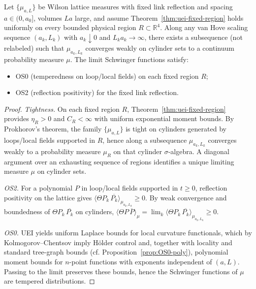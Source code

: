 \documentclass[11pt]{amsart}
\begin{document}
\medskip
\begin{proposition}\label{prop:os0os2-closure}
Let $\{\mu_{a,L}\}$ be Wilson lattice measures with fixed link reflection and spacing $a\in(0,a_0]$, volumes $L a$ large, and assume Theorem~\ref{thm:uei-fixed-region} holds uniformly on every bounded physical region $R\subset\mathbb R^4$. Along any van Hove scaling sequence $(a_k,L_k)$ with $a_k\downarrow 0$ and $L_k a_k\to\infty$, there exists a subsequence (not relabeled) such that $\mu_{a_k,L_k}$ converges weakly on cylinder sets to a continuum probability measure $\mu$. The limit Schwinger functions satisfy:
\begin{itemize}
  \item OS0 (temperedness on loop/local fields) on each fixed region $R$;
  \item OS2 (reflection positivity) for the fixed link reflection.
\end{itemize}
\end{proposition}
\begin{proof}
\emph{Tightness.} On each fixed region $R$, Theorem~\ref{thm:uei-fixed-region} provides $\eta_R>0$ and $C_R<\infty$ with uniform exponential moment bounds. By Prokhorov's theorem, the family $\{\mu_{a,L}\}$ is tight on cylinders generated by loops/local fields supported in $R$, hence along a subsequence $\mu_{a_k,L_k}$ converges weakly to a probability measure $\mu_R$ on that cylinder $\sigma$-algebra. A diagonal argument over an exhausting sequence of regions identifies a unique limiting measure $\mu$ on cylinder sets.

\emph{OS2.} For a polynomial $P$ in loop/local fields supported in $t\ge 0$, reflection positivity on the lattice gives $\langle \Theta P_k\,\overline{P_k}\rangle_{\mu_{a_k,L_k}}\ge 0$. By weak convergence and boundedness of $\Theta P_k\,\overline{P_k}$ on cylinders, $\langle \Theta P\,\overline{P}\rangle_{\mu}=\lim_k \langle \Theta P_k\,\overline{P_k}\rangle_{\mu_{a_k,L_k}}\ge 0$.

\emph{OS0.} UEI yields uniform Laplace bounds for local curvature functionals, which by Kolmogorov--Chentsov imply Hölder control and, together with locality and standard tree-graph bounds (cf. Proposition~\ref{prop:OS0-poly}), polynomial moment bounds for $n$-point functions with exponents independent of $(a,L)$. Passing to the limit preserves these bounds, hence the Schwinger functions of $\mu$ are tempered distributions.
\end{proof}
\end{document}
